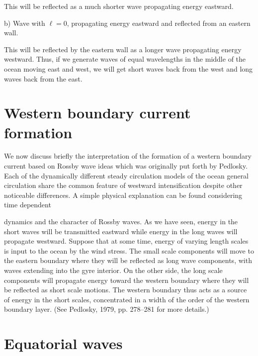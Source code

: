 This will be reflected as a much shorter wave propagating energy eastward.

\noindent b) Wave with $\ell=0$, propagating energy eastward and reflected from an
eastern wall.


This will be reflected by the eastern wall as a longer wave propagating energy
westward. Thus, if we generate waves of equal wavelengths in the middle of the ocean
moving east and west, we will get short waves back from the west and long waves back
from the east.

\section{Western boundary current formation}

We now discuss briefly the interpretation of the formation of a western boundary
current based on Rossby wave ideas which was originally put forth by Pedlosky. Each of
the dynamically different steady circulation models of the ocean general circulation
share the common feature of westward intensification despite other noticeable
differences. A simple physical explanation can be found considering time dependent

\sourcepagebreak

dynamics and the character of Rossby waves. As we have seen, energy in the short
waves will be transmitted eastward while energy in the long waves will propagate
westward. Suppose that at some time, energy of varying length scales is input to the
ocean by the wind stress. The small scale components will move to the eastern boundary
where they will be reflected as long wave components, with waves extending into the
gyre interior. On the other side, the long scale components will propagate energy
toward the western boundary where they will be reflected as short scale motions. The
western boundary thus acts as a source of energy in the short scales, concentrated in a
width of the order of the western boundary layer. (See Pedlosky, 1979, pp. 278--281 for
more details.)

\section{Equatorial waves}

